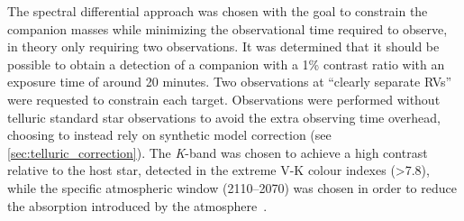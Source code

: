 The spectral differential approach was chosen with the goal to constrain the companion masses while minimizing the observational time required to observe, in theory only requiring two observations.
It was determined that it should be possible to obtain a detection of a companion with a 1\% contrast ratio with an exposure time of around 20 minutes.
Two observations at ``clearly separate {RV}s'' were requested to constrain each target.
Observations were performed without telluric standard star observations to avoid the extra observing time overhead, choosing to instead rely on synthetic model correction (see \cref{sec:telluric_correction}).
The \textit{K}-band was chosen to achieve a high contrast relative to the host star, detected in the extreme V-K colour indexes (>7.8), while the specific atmospheric window (2110--2070\nm{}) was chosen in order to reduce the absorption introduced by the atmosphere~\citep{barnes_hd_2008}.
